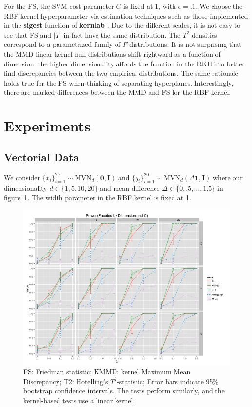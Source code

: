 For the FS, the SVM cost parameter $C$ is fixed at 1, with $\epsilon =
.1$.  We choose the RBF kernel hyperparameter via estimation
techniques such as those implemented in the {\bf sigest} function of 
{\bf kernlab} \cite{kernlab}.  Due to the different
scales, it is not easy to see that FS and
$|T|$ in fact have the same distribution.  The $T^2$ densities correspond to a
parametrized family of $F$-distributions.  It is not surprising that the MMD
linear kernel null distributions shift rightward as a function of
dimension: the higher dimensionality affords the function in the RKHS
to better find discrepancies between the two empirical distributions.
The same rationale holds true for the FS when thinking of separating
hyperplanes.  Interestingly, there are marked differences between the
MMD and FS for the RBF kernel.

\section{Experiments}
\subsection{Vectorial Data}
We consider $\{x_i\}_{i=1}^{20} \sim \mathrm{MVN}_d(\mathbf{0},
\mathbf{I})$ and $\{y_i\}_{i=1}^{20} \sim
\mathrm{MVN}_d(\Delta \mathbf{1}, \mathbf{I})$ where our
dimensionality $d \in \{1, 5, 10, 20\}$ and mean difference $\Delta \in
\{0, .5, \ldots, 1.5\}$ in figure~\ref{fig:power_normal}.  The width
parameter in the RBF kernel is fixed at 1.

\begin{figure}
  \centering
  \includegraphics[width=\linewidth]{power_normal.png}
  \caption{FS: Friedman statistic; KMMD: kernel Maximum Mean
    Discrepancy; T2: Hotelling's $T^2$-statistic; Error bars indicate
    95\% bootstrap confidence intervals.  The tests perform similarly,
    and the kernel-based tests use a linear kernel.}
  \label{fig:power_normal}
\end{figure}

